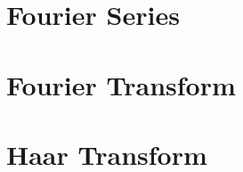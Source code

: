 
\makeindex



    

    \tableofcontents

    \chapter{Fourier Series}
	\label{ch:fs}

	
	
	
  

    \chapter{Fourier Transform}
    \label{ch:ft}
    


    \chapter{Haar Transform}
    \label{ch:ht}
    

    
    



